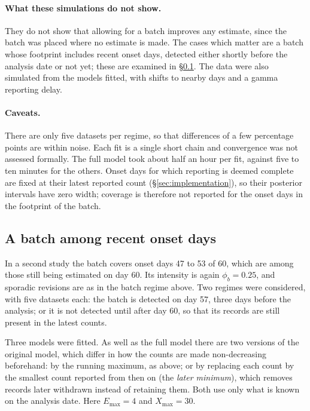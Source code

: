 \documentclass[11pt,a4paper]{article}
\newcommand{\Emax}{E_{\max}}
\newcommand{\Xmax}{X_{\max}}
\begin{document}
\paragraph{What these simulations do not show.} They do not show that
allowing for a batch improves any estimate, since the batch was placed where
no estimate is made. The cases which matter are a batch whose footprint
includes recent onset days, detected either shortly before the analysis date
or not yet; these are examined in \S\ref{sec:frontier}. The data were also
simulated from the models fitted, with shifts to nearby days and a gamma
reporting delay.

\paragraph{Caveats.} There are only five datasets per regime, so that
differences of a few percentage points are within noise. Each fit is a single
short chain and convergence was not assessed formally. The full model took
about half an hour per fit, against five to ten minutes for the others. Onset
days for which reporting is deemed complete are fixed at their latest reported
count (\S\ref{sec:implementation}), so their posterior intervals have zero
width; coverage is therefore not reported for the onset days in the footprint
of the batch.

\subsection{A batch among recent onset days}\label{sec:frontier}

In a second study the batch covers onset days 47 to 53 of 60, which are among
those still being estimated on day 60. Its intensity is again $\phi_b=0.25$,
and sporadic revisions are as in the batch regime above. Two regimes were
considered, with five datasets each: the batch is detected on day 57, three
days before the analysis; or it is not detected until after day 60, so that its
records are still present in the latest counts.

Three models were fitted. As well as the full model there are two versions of
the original model, which differ in how the counts are made non-decreasing
beforehand: by the running maximum, as above; or by replacing each count by the
smallest count reported from then on (the \emph{later minimum}), which removes
records later withdrawn instead of retaining them. Both use only what is known
on the analysis date. Here $\Emax=4$ and $\Xmax=30$.
\end{document}
